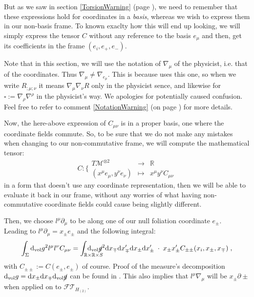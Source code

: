 \documentclass[a4paper,11pt]{article}
\numberwithin{equation}{section}
\theoremstyle{definition}
\renewcommand{\d}{{\mathrm{d}}}
\begin{document}
But as we saw in section \ref{TorsionWarning} (page \pageref{TorsionWarning}), we need to remember that these expressions hold for coordinates in a \emph{basis}, whereas we wish to express them in our non-basis frame. To known exaclty how this will end up looking, we will simply express the tensor $C$ without any reference to the basis $e_\mu$ and then, get its coefficients in the frame $(e_i,e_+,e_-)$.

Note that in this section, we will use the notation of $\nabla_\mu$ of the physicist, i.e. that of the coordinates. Thus $\nabla_\mu \ne \nabla_{e_\mu}$. This is because \cite{QFTCurv} uses this one, so when we write $R_{;\mu;\nu}$ it means $\nabla_\mu \nabla_\nu R$ only in the physicist sence, and likewise for $\square:=\nabla_\rho \nabla^\rho$ in the physicist's way. We apologies for potentially caused confusion. Feel free to refer to comment \ref{NotationWarning} (on page \pageref{NotationWarning}) for more details.

Now, the here-above expression of $C_{\mu\nu}$ is in a proper basis, one where the coordinate fields commute. So, to be sure that we do not make any mistakes when changing to our non-commutative frame, we will compute the mathematical tensor:
\begin{equation}
C : \Bigg\{\begin{matrix}
    T\mathcal{M}^{\otimes2} & \to & \mathbb{R}\\
    (x^\mu e_\mu, y^\nu e_\nu) & \mapsto & x^\mu y^\nu C_{\mu\nu}
\end{matrix}
\end{equation}
in a form that doesn't use any coordinate representation, then we will be able to evaluate it back in our frame, without any worries of what having non-commutative coordinate fields could cause being slightly different.

Then, we choose $l^\mu \partial_\mu$ to be along one of our null foliation coordinate $e_\pm$. \\
Leading to $l^\mu \partial_\mu = x_\pm e_\pm$ and the following integral:
\begin{equation}
    \int_\Sigma \d_\mathrm{vol}g^2 l^\mu l^\nu C_{\mu\nu} = \int_{\mathbb{R}\times \mathbb{R}\times S} \!\!\!\!\!\!\!\!\!\!\!\!\!\!\! \d_\mathrm{vol} \cancel{g}^2 \d x_\mp \d x_\mp' \d x_\pm \d x_\pm ' \;\cdot \; x_\pm x_\pm ' C_{\pm\pm}(x_i,x_\pm, x_\mp)\; ,
\end{equation}
with $C_{\pm\pm}:= C(e_\pm,e_\pm)$ of course. Proof of the measure's decomposition $\d_\mathrm{vol}g = \d x_\pm \d x_\mp \d_\mathrm{vol} \cancel{g}$ can be found in \cite{Art}. This also implies that $l^\mu \nabla_\mu$ will be $x_\pm \partial\pm$ when applied on to $\mathcal{FT}_{H_{(2)}}$.
\end{document}
